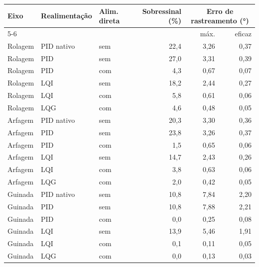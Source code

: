 \begin{tabular}{lllrrr}
\toprule
Eixo & Realimentação & Alim. direta & Sobressinal (\%) & \multicolumn{2}{c}{Erro de rastreamento (\si{\degree})} \\
\cmidrule(lr){5-6}
 & & & & máx. & eficaz \\
\midrule
Rolagem & PID nativo & sem & 22,4 & 3,26 & 0,37 \\
Rolagem & PID & sem & 27,0 & 3,31 & 0,39 \\
Rolagem & PID & com & 4,3 & 0,67 & 0,07 \\
Rolagem & LQI & sem & 18,2 & 2,44 & 0,27 \\
Rolagem & LQI & com & 5,8 & 0,61 & 0,06 \\
Rolagem & LQG & com & 4,6 & 0,48 & 0,05 \\
\addlinespace
Arfagem & PID nativo & sem & 20,3 & 3,30 & 0,36 \\
Arfagem & PID & sem & 23,8 & 3,26 & 0,37 \\
Arfagem & PID & com & 1,5 & 0,65 & 0,06 \\
Arfagem & LQI & sem & 14,7 & 2,43 & 0,26 \\
Arfagem & LQI & com & 3,8 & 0,63 & 0,06 \\
Arfagem & LQG & com & 2,0 & 0,42 & 0,05 \\
\addlinespace
Guinada & PID nativo & sem & 10,8 & 7,84 & 2,20 \\
Guinada & PID & sem & 10,8 & 7,88 & 2,21 \\
Guinada & PID & com & 0,0 & 0,25 & 0,08 \\
Guinada & LQI & sem & 13,9 & 5,46 & 1,91 \\
Guinada & LQI & com & 0,1 & 0,11 & 0,05 \\
Guinada & LQG & com & 0,0 & 0,13 & 0,03 \\
\bottomrule
\end{tabular}
